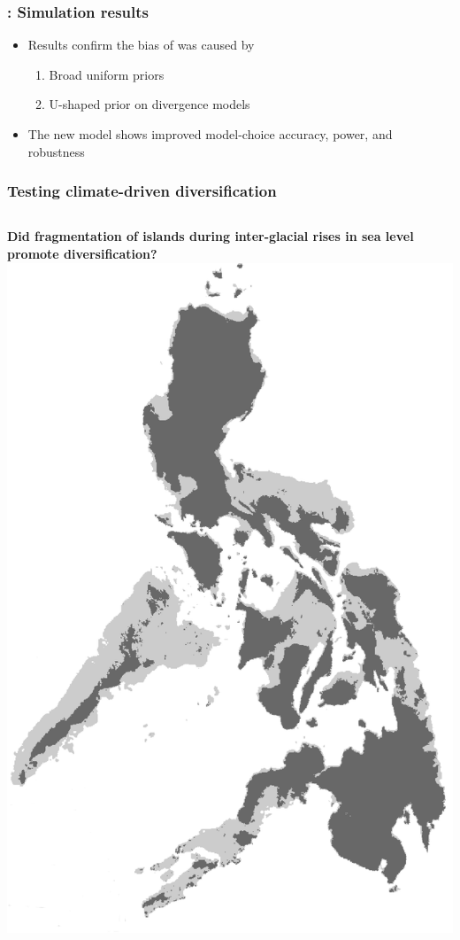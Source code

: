 \begin{frame}
    \frametitle{\dppmsbayes: Simulation results}
    \begin{itemize}
        \item Results confirm the bias of \msb was caused by

        \begin{enumerate}
            \item Broad uniform priors
            \item U-shaped prior on divergence models
        \end{enumerate}

        \item The new model shows improved model-choice accuracy, power, and
            robustness
    \end{itemize}
\end{frame}

\begin{frame}
    \frametitle{Testing climate-driven diversification}
    \begin{columns}[c]
    \textbf{Did fragmentation of islands during inter-glacial rises in sea level
    promote diversification?}\\
            \includegraphics[width=\textwidth]{../images/maps/Philippines.png}
    \end{columns}
\end{frame}

